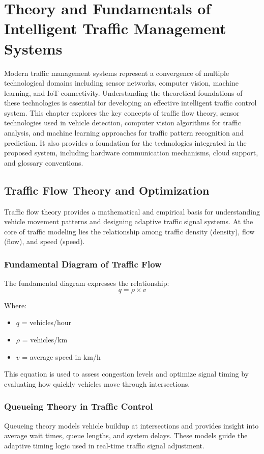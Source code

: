 \documentclass[12pt]{report}
\begin{document}
\chapter{Theory and Fundamentals of Intelligent Traffic Management Systems}

Modern traffic management systems represent a convergence of multiple technological domains including sensor networks, computer vision, machine learning, and IoT connectivity. Understanding the theoretical foundations of these technologies is essential for developing an effective intelligent traffic control system. This chapter explores the key concepts of traffic flow theory, sensor technologies used in vehicle detection, computer vision algorithms for traffic analysis, and machine learning approaches for traffic pattern recognition and prediction. It also provides a foundation for the technologies integrated in the proposed system, including hardware communication mechanisms, cloud support, and glossary conventions.

\section{Traffic Flow Theory and Optimization}

Traffic flow theory provides a mathematical and empirical basis for understanding vehicle movement patterns and designing adaptive traffic signal systems. At the core of traffic modeling lies the relationship among traffic density (\gls{density}), flow (\gls{flow}), and speed (\gls{speed}).

\subsection{Fundamental Diagram of Traffic Flow}
The fundamental diagram expresses the relationship:
\begin{equation}
q = \rho \times v
\end{equation}

Where:
\begin{itemize}
\item $q$ = vehicles/hour
\item $\rho$ = vehicles/km
\item $v$ = average speed in km/h
\end{itemize}
This equation is used to assess congestion levels and optimize signal timing by evaluating how quickly vehicles move through intersections.

\subsection{Queueing Theory in Traffic Control}
Queueing theory models vehicle buildup at intersections and provides insight into average wait times, queue lengths, and system delays. These models guide the adaptive timing logic used in real-time traffic signal adjustment.
\end{document}
